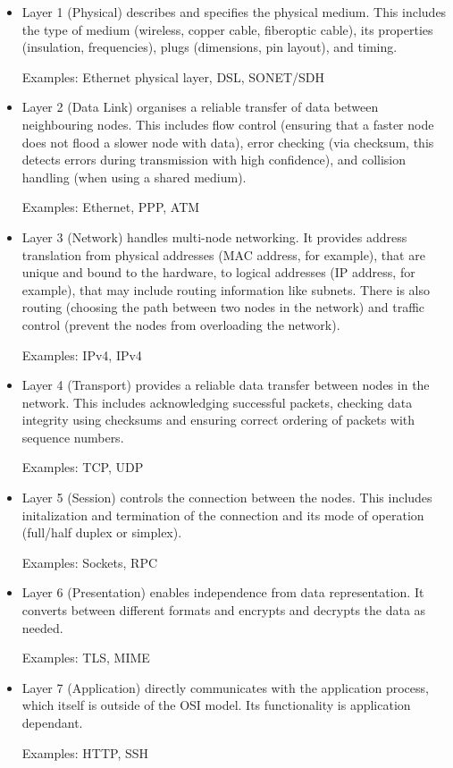 \documentclass[12pt, a4paper]{article}
\begin{document}
\begin{itemize}
\item Layer 1 (Physical) describes and specifies the physical medium. This includes the type of medium (wireless, copper cable, fiberoptic cable), its properties (insulation, frequencies), plugs (dimensions, pin layout), and timing.

Examples: Ethernet physical layer, DSL, SONET/SDH

\item Layer 2 (Data Link) organises a reliable transfer of data between neighbouring nodes. This includes flow control (ensuring that a faster node does not flood a slower node with data), error checking (via checksum, this detects errors during transmission with high confidence), and collision handling (when using a shared medium).

Examples: Ethernet, PPP, ATM

\item Layer 3 (Network) handles multi-node networking. It provides address translation from physical addresses (MAC address, for example), that are unique and bound to the hardware, to logical addresses (IP address, for example), that may include routing information like subnets. There is also routing (choosing the path between two nodes in the network) and traffic control (prevent the nodes from overloading the network).

Examples: IPv4, IPv4

\item Layer 4 (Transport) provides a reliable data transfer between nodes in the network. This includes acknowledging successful packets, checking data integrity using checksums and ensuring correct ordering of packets with sequence numbers.

Examples: TCP, UDP

\item Layer 5 (Session) controls the connection between the nodes. This includes initalization and termination of the connection and its mode of operation (full/half duplex or simplex). 

Examples: Sockets, RPC

\item Layer 6 (Presentation) enables independence from data representation. It converts between different formats and encrypts and decrypts the data as needed.

Examples: TLS, MIME

\item Layer 7 (Application) directly communicates with the application process, which itself is outside of the OSI model. Its functionality is application dependant.

Examples: HTTP, SSH
\end{itemize}
\end{document}
